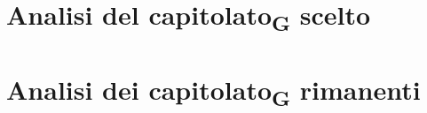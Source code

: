 \documentclass[a4paper]{article}
\begin{document}
	
	\pagebreak

	
	\pagebreak

    {
        \hypersetup{linkcolor=black}
        \tableofcontents
    }
	\pagebreak




	\pagebreak

	\section{Analisi del capitolato\textsubscript{G} scelto}
	\pagebreak

	\section{Analisi dei capitolato\textsubscript{G} rimanenti}
	\pagebreak

	\pagebreak

	\pagebreak

	\pagebreak

	\pagebreak

	\pagebreak
\end{document}
